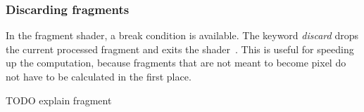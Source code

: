\subsubsection{Discarding fragments}
In the fragment shader, a break condition is available. The keyword \emph{discard} drops the current processed fragment and exits the shader~\cite{misc:glslTut}. This is useful for speeding up the computation, because fragments that are not meant to become pixel do not have to be calculated in the first place.

TODO explain fragment




